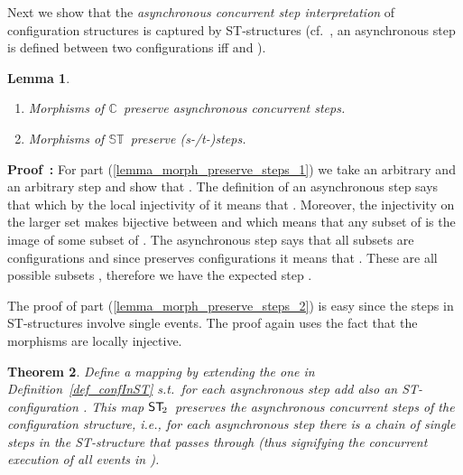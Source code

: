 \documentclass[submission,copyright,creativecommons]{eptcs}
\newtheorem{theorem}{Theorem}[section]
\newtheorem{lemma}[theorem]{Lemma}
\newenvironment{proof}[1][\!\!\,]{\vspace{1ex}\noindent\textbf{Proof #1: }}{\hfill\vspace{2ex}}
\newcommand{\refeq}[1]{(\ref{#1})}
\newcommand\allC{\ensuremath{\mathbb{C}}}
\newcommand\allST{\ensuremath{\mathbb{ST}}}
\newcommand\cintostSecond{\ensuremath{\mathsf{ST}_{\hspace{-0.4ex}2}}}
\begin{document}
Next we show that the \textit{asynchronous concurrent step interpretation} of configuration structures is captured by ST-structures (cf.~\cite[Def.2.1]{GlabbeekP09configStruct}, an asynchronous step is defined between two configurations  iff  and ).

\begin{lemma}\label{lemma_morph_preserve_steps}
\ 

\begin{enumerate}
\item\label{lemma_morph_preserve_steps_1} Morphisms of \allC\ preserve asynchronous concurrent steps. 

\item\label{lemma_morph_preserve_steps_2} Morphisms of \allST\ preserve (s-/t-)steps.
\end{enumerate}
\end{lemma}

\begin{proof}
For part \refeq{lemma_morph_preserve_steps_1} we take an arbitrary  and an arbitrary step  and show that . The definition of an asynchronous step says that  which by the local injectivity of  it means that . Moreover, the injectivity on the larger set  makes  bijective between  and  which means that any subset of  is the image of some subset of . The asynchronous step says that all subsets  are configurations  and since  preserves configurations it means that . These are all possible subsets , therefore we have the expected step .

The proof of part \refeq{lemma_morph_preserve_steps_2} is easy since the steps in ST-structures involve single events. The proof again uses the fact that the morphisms are locally injective.
\end{proof}



\begin{theorem}\label{th_configtoSTsteps}
Define a mapping  by extending the one in Definition~\ref{def_confInST} s.t.\ for each asynchronous step  add also an ST-configuration .
This map \cintostSecond\ preserves the asynchronous concurrent steps of the configuration structure, i.e., for each asynchronous step  there is a chain of single steps in the ST-structure  that passes through  (thus signifying the concurrent execution of all events in ).
\end{theorem}
\end{document}
